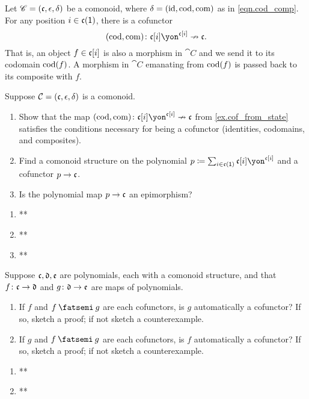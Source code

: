 \documentclass[Book-Poly]{subfiles}
\begin{document}
\begin{example}\label{ex.cof_from_state}
Let $\mathscr{C}=(\mathfrak{c},\epsilon,\delta)$ be a comonoid, where $\delta=(\mathrm{id},\operatorname{cod},\operatorname{com})$ as in \eqref{eqn.cod_comp}. For any position $i\in\mathfrak{c}(\textsf{1})$, there is a cofunctor
\[
	(\cod,\comp)\colon\ema{c}[i]\yon^{\ema{c}[i]}\cof\ema{c}.
\]
That is, an object $f\in \mathfrak{c}[i]$ is also a morphism in $\cat{C}$ and we send it to its codomain $\operatorname{cod}(f)$. A morphism in $\cat{C}$ emanating from $\operatorname{cod}(f)$ is passed back to its composite with $f$. 
\end{example}

\begin{exercise}
Suppose $\mathcal{C}=(\mathfrak{c},\epsilon,\delta)$ is a comonoid.
\begin{enumerate}
	\item Show that the map $(\cod,\comp)\colon\ema{c}[i]\yon^{\ema{c}[i]}\cof\ema{c}$ from \cref{ex.cof_from_state} satisfies the conditions necessary for being a cofunctor (identities, codomains, and composites).
	\item Find a comonoid structure on the polynomial $p\coloneqq\sum_{i\in\ema{c}(\1)}\ema{c}[i]\yon^{\ema{c}[i]}$ and a cofunctor $p\to\mathfrak{c}$.
	\item Is the polynomial map $p\to\mathfrak{c}$ an epimorphism?
\qedhere
\end{enumerate}
\begin{solution}
\begin{enumerate}
    \item **
    \item **
    \item **
\end{enumerate}
\end{solution}
\end{exercise}

\begin{exercise}
Suppose $\mathfrak{c},\mathfrak{d},\mathfrak{e}$ are polynomials, each with a comonoid structure, and that $f\colon \mathfrak{c}\to\mathfrak{d}$ and $g\colon\mathfrak{d}\to\mathfrak{e}$ are maps of polynomials.
\begin{enumerate}
	\item If $f$ and $f\then g$ are each cofunctors, is $g$ automatically a cofunctor? If so, sketch a proof; if not sketch a counterexample.
	\item If $g$ and $f\then g$ are each cofunctors, is $f$ automatically a cofunctor? If so, sketch a proof; if not sketch a counterexample.
\qedhere
\end{enumerate}
\begin{solution}
\begin{enumerate}
    \item **
    \item **
\end{enumerate}
\end{solution}
\end{exercise}
\end{document}
